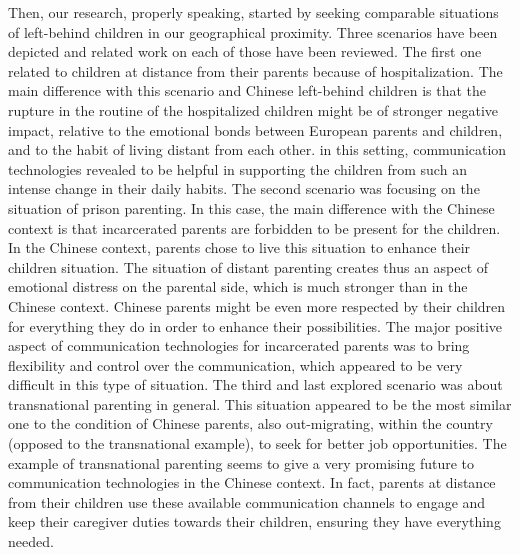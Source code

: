 Then, our research, properly speaking, started by seeking comparable situations of left-behind children in our geographical proximity. Three scenarios have been depicted and related work on each of those have been reviewed. The first one related to children at distance from their parents because of hospitalization. The main difference with this scenario and Chinese left-behind children is that the rupture in the routine of the hospitalized children might be of stronger negative impact, relative to the emotional bonds between European parents and children, and to the habit of living distant from each other. in this setting, communication technologies revealed to be helpful in supporting the children from such an intense change in their daily habits. The second scenario was focusing on the situation of prison parenting. In this case, the main difference with the Chinese context is that incarcerated parents are forbidden to be present for the children. In the Chinese context, parents chose to live this situation to enhance their children situation. The situation of distant parenting creates thus an aspect of emotional distress on the parental side, which is much stronger than in the Chinese context. Chinese parents might be even more respected by their children for everything they do in order to enhance their possibilities. The major positive aspect of communication technologies for incarcerated parents was to bring flexibility and control over the communication, which appeared to be very difficult in this type of situation. The third and last explored scenario was about transnational parenting in general. This situation appeared to be the most similar one to the condition of Chinese parents, also out-migrating, within the country (opposed to the transnational example), to seek for better job opportunities. The example of transnational parenting seems to give a very promising future to communication technologies in the Chinese context. In fact, parents at distance from their children use these available communication channels to engage and keep their caregiver duties towards their children, ensuring they have everything needed. 

